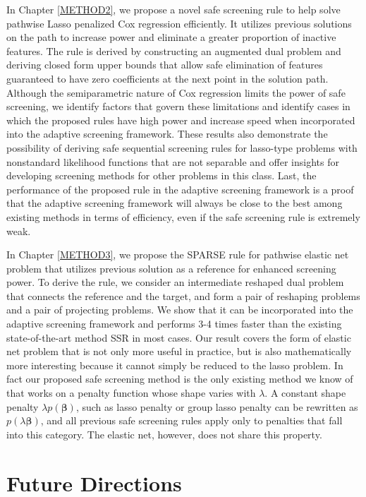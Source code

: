 In Chapter \ref{METHOD2}, we propose a novel safe screening rule to help solve pathwise Lasso penalized Cox regression efficiently. It utilizes previous solutions on the path to increase power and eliminate a greater proportion of inactive features. The rule is derived by constructing an augmented dual problem and deriving closed form upper bounds that allow safe elimination of features guaranteed to have zero coefficients at the next point in the solution path. Although the semiparametric nature of Cox regression limits the power of safe screening, we identify factors that govern these limitations and identify cases in which the proposed rules have high power and increase speed when incorporated into the adaptive screening framework. These results also demonstrate the possibility of deriving safe sequential screening rules for lasso-type problems with nonstandard likelihood functions that are not separable and offer insights for developing screening methods for other problems in this class. Last, the performance of the proposed rule in the adaptive screening framework is a proof that the adaptive screening framework will always be close to the best among existing methods in terms of efficiency, even if the safe screening rule is extremely weak.

In Chapter \ref{METHOD3}, we propose the SPARSE rule for pathwise elastic net problem that utilizes previous solution as a reference for enhanced screening power. To derive the rule, we consider an intermediate reshaped dual problem that connects the reference and the target, and form a pair of reshaping problems and a pair of projecting problems. We show that it can be incorporated into the adaptive screening framework and performs 3-4 times faster than the existing state-of-the-art method SSR in most cases. Our result covers the form of elastic net problem that is not only more useful in practice, but is also mathematically more interesting because it cannot simply be reduced to the lasso problem. In fact our proposed safe screening method is the only existing method we know of that works on a penalty function whose shape varies with $\lambda$. A constant shape penalty $\lambda p(\boldsymbol\beta)$, such as lasso penalty or group lasso penalty can be rewritten as $p(\lambda\boldsymbol\beta)$, and all previous safe screening rules apply only to penalties that fall into this category. The elastic net, however, does not share this property.

\section{Future Directions}

